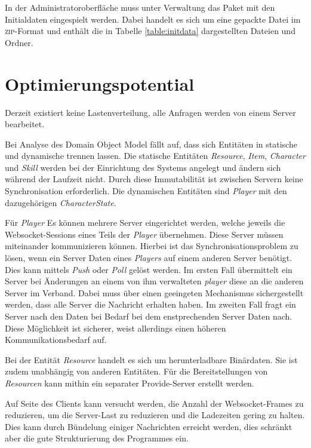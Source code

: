 \documentclass[ngerman,11pt]{report}
\begin{document}
In der Administratoroberfläche muss unter Verwaltung das Paket mit den Initialdaten eingespielt werden. Dabei
handelt es sich um eine gepackte Datei im \textsc{zip}-Format und enthält die in Tabelle \ref{table:initdata}
dargestellten Dateien und Ordner.

\chapter{Optimierungspotential}

Derzeit existiert keine Lastenverteilung, alle Anfragen werden von einem Server bearbeitet.

Bei Analyse des Domain Object Model fällt auf, dass sich Entitäten in statische und dynamische
trennen lassen. Die statische Entitäten \textit{Resource}, \textit{Item}, \textit{Character}
und \textit{Skill} werden bei der Einrichtung des Systems angelegt und ändern sich während der
Laufzeit nicht. Durch diese Immutabilität ist zwischen Servern keine Synchronisation erforderlich.
Die dynamischen Entitäten sind \textit{Player} mit den dazugehörigen \textit{CharacterState}.

Für \textit{Player} Es können mehrere Server eingerichtet werden, welche jeweils die Websocket-Sessions eines Teils der \textit{Player} übernehmen. Diese Server müssen miteinander kommunizieren können.
Hierbei ist das Synchronisationsproblem zu lösen, wenn ein Server Daten eines \textit{Players} auf
einem anderen Server benötigt. Dies kann mittels \textit{Push} oder \textit{Poll} gelöst werden.
Im ersten Fall übermittelt ein Server bei Änderungen an einem von ihm verwalteten \textit{player}
diese an die anderen Server im Verband. Dabei muss über einen geeingeten Mechanismus sichergestellt
werden, dass alle Server die Nachricht erhalten haben. Im zweiten Fall fragt ein Server nach den
Daten bei Bedarf bei dem enstprechenden Server Daten nach. Diese Möglichkeit ist sicherer, 
weist allerdings einen höheren Kommunikationsbedarf auf.

Bei der Entität \textit{Resource} handelt es sich um herunterladbare Binärdaten. Sie ist zudem
unabhängig von anderen Entitäten. Für die Bereitstellungen von \textit{Resourcen} kann mithin
ein separater Provide-Server erstellt werden.

Auf Seite des Clients kann versucht werden, die Anzahl der Websocket-Frames zu reduzieren, um
die Server-Last zu reduzieren und die Ladezeiten gering zu halten. Dies kann durch Bündelung einiger
Nachrichten erreicht werden, dies schränkt aber die gute Strukturierung des Programmes ein.
\end{document}
